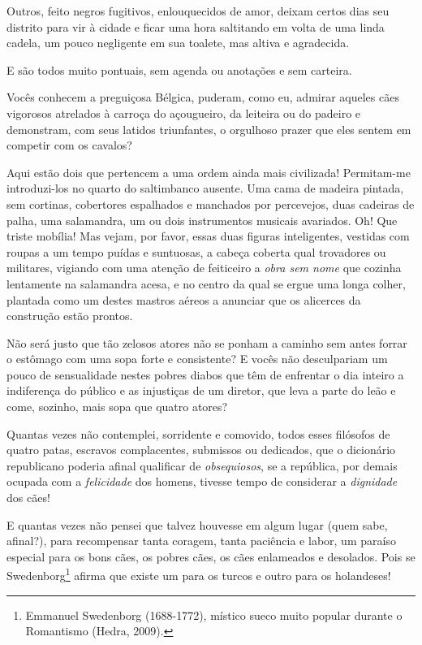 Outros, feito negros fugitivos, enlouquecidos de amor, deixam certos
dias seu distrito para vir à cidade e ficar uma hora saltitando em volta de
uma linda cadela, um pouco negligente em sua toalete, mas
altiva e agradecida.

E são todos muito pontuais, sem agenda ou anotações e sem
carteira.

Vocês conhecem a preguiçosa Bélgica, puderam, como eu, admirar
aqueles cães vigorosos atrelados à carroça do açougueiro, da leiteira ou
do padeiro e demonstram, com seus latidos triunfantes, o orgulhoso prazer
que eles sentem em competir com os cavalos?

Aqui estão dois que pertencem a uma ordem ainda mais civilizada!
Permitam-me introduzi-los no quarto do saltimbanco ausente. Uma
cama de madeira pintada, sem cortinas, cobertores espalhados e
manchados por percevejos, duas cadeiras de palha, uma salamandra, um ou
dois instrumentos musicais avariados. Oh! Que triste mobília! Mas
vejam, por favor, essas duas figuras inteligentes, vestidas com roupas
a um tempo puídas e suntuosas, a cabeça coberta qual trovadores ou
militares, vigiando com uma atenção de feiticeiro a \textit{obra sem nome}
que cozinha lentamente na salamandra acesa, e no centro da qual
se ergue uma longa colher, plantada como um destes mastros aéreos a
anunciar que os alicerces da construção estão prontos.

Não será justo que tão zelosos atores não se ponham a caminho sem antes
forrar o estômago com uma sopa forte e consistente? E vocês não
desculpariam um pouco de sensualidade nestes pobres diabos que têm de
enfrentar o dia inteiro a indiferença do público e as injustiças de um
diretor, que leva a parte do leão e come, sozinho, mais sopa que
quatro atores?

Quantas vezes não contemplei, sorridente e comovido, todos esses
filósofos de quatro patas, escravos complacentes, submissos ou
dedicados, que o dicionário republicano poderia afinal qualificar de
\textit{obsequiosos}, se a república, por demais ocupada com a \textit{felicidade} dos
homens, tivesse tempo de considerar a \textit{dignidade} dos cães!

E quantas vezes não pensei que talvez houvesse em algum lugar (quem
sabe, afinal?), para recompensar tanta coragem, tanta paciência e
labor, um paraíso especial para os bons cães, os pobres cães, os cães
enlameados e desolados. Pois se Swedenborg\footnote{ Emmanuel 
Swedenborg (1688-1772), místico sueco muito popular durante o Romantismo (Hedra, 2009).}
afirma que existe um para os turcos e outro para os holandeses!

